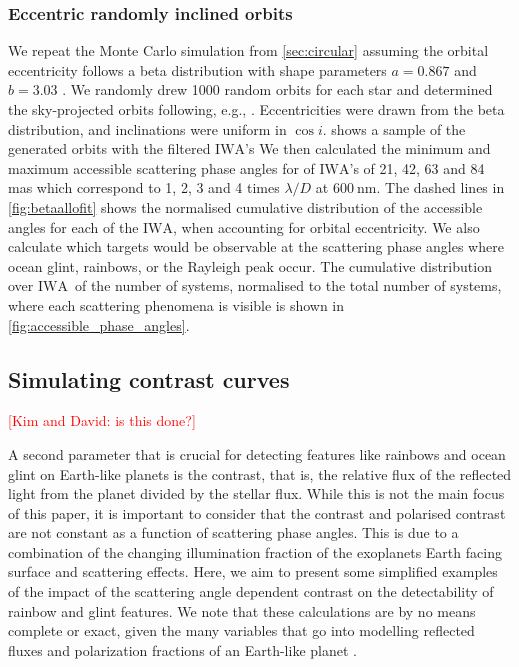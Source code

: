 \documentclass[
    usenatbib,
]{mnras}
\newcommand{\todo}[1]{\textcolor{red}{[#1]}}
\newcommand{\IWA}{\ensuremath{\mathrm{IWA}}}
\begin{document}
\subsubsection{Eccentric randomly inclined orbits}
\label{sec:eccentric}
We repeat the Monte Carlo simulation from \cref{sec:circular} assuming the orbital eccentricity follows a beta distribution with shape parameters $a=0.867$ and $b=3.03$ \citep{2013MNRAS.434L..51K}. 
%
We randomly drew 1000 random orbits for each star and determined the sky-projected orbits following, e.g., \cite{2010exop.book...15M}. Eccentricities were drawn from the beta distribution, and inclinations were uniform in $\cos i$.  shows a sample of the generated orbits with the filtered \IWA's
%
%
We then calculated the minimum and maximum accessible scattering phase angles for of \IWA's of 21, 42, 63 and 84 mas which correspond to 1, 2, 3 and 4 times $\lambda / D$ at $\SI{600}{\nano\meter}$.
%
The dashed lines in \cref{fig:betaallofit} shows the normalised cumulative distribution of the accessible angles for each of the \IWA, when accounting for orbital eccentricity.
%
We also calculate which targets would be observable at the scattering phase angles where ocean glint, rainbows, or the Rayleigh peak occur.
%
The cumulative distribution over \IWA\ of the number of systems, normalised to the total number of systems, where each scattering phenomena is visible is shown in \cref{fig:accessible_phase_angles}.
%
 
\subsection{Simulating contrast curves}
\todo{Kim and David: is this done?}

A second parameter that is crucial for detecting features like rainbows and ocean glint on Earth-like planets is the contrast, that is, the relative flux of the reflected light from the planet divided by the stellar flux. 
%
While this is not the main focus of this paper, it is important to consider that the contrast and polarised contrast are not constant as a function of scattering phase angles.
%
This is due to a combination of the changing illumination fraction of the exoplanets Earth facing surface and scattering effects.
%
Here, we aim to present some simplified examples of the impact of the scattering angle dependent contrast on the detectability of rainbow and glint features. 
%
We note that these calculations are by no means complete or exact, given the many variables that go into modelling reflected fluxes and polarization fractions of an Earth-like planet \citep{ treesandstam2019,trees2022}.
\end{document}
